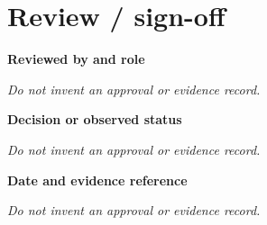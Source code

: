 \documentclass[11pt,letterpaper]{article}
\begin{document}
\section{Review / sign-off}
\noindent\textbf{Reviewed by and role}\par
\emph{Do not invent an approval or evidence record.}\par\medskip
\noindent\textbf{Decision or observed status}\par
\emph{Do not invent an approval or evidence record.}\par\medskip
\noindent\textbf{Date and evidence reference}\par
\emph{Do not invent an approval or evidence record.}\par\medskip
\end{document}
